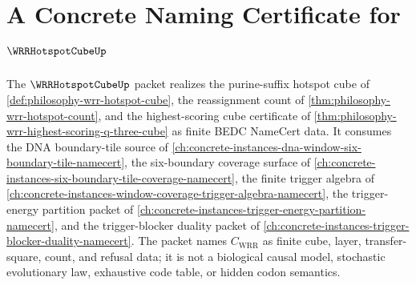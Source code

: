 \chapter{A Concrete Naming Certificate for $\WRRHotspotCubeUp$}
\label{ch:concrete-instances-wrr-hotspot-cube-namecert}

The $\WRRHotspotCubeUp$ packet realizes the purine-suffix hotspot cube of \autoref{def:philosophy-wrr-hotspot-cube}, the reassignment count of \autoref{thm:philosophy-wrr-hotspot-count}, and the highest-scoring cube certificate of \autoref{thm:philosophy-wrr-highest-scoring-q-three-cube} as finite BEDC NameCert data. It consumes the DNA boundary-tile source of \autoref{ch:concrete-instances-dna-window-six-boundary-tile-namecert}, the six-boundary coverage surface of \autoref{ch:concrete-instances-six-boundary-tile-coverage-namecert}, the finite trigger algebra of \autoref{ch:concrete-instances-window-coverage-trigger-algebra-namecert}, the trigger-energy partition packet of \autoref{ch:concrete-instances-trigger-energy-partition-namecert}, and the trigger-blocker duality packet of \autoref{ch:concrete-instances-trigger-blocker-duality-namecert}. The packet names $C_{\mathrm{WRR}}$ as finite cube, layer, transfer-square, count, and refusal data; it is not a biological causal model, stochastic evolutionary law, exhaustive code table, or hidden codon semantics.

